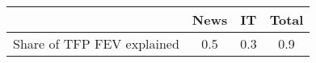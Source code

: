 \begin{small}
	\begin{tabular}{lccc}
	\hline
		& News & IT & Total \\
		\hline
		Share of TFP FEV explained & 0.5 & 0.3 & 0.9 \\
		\hline
	\end{tabular}
\end{small}
